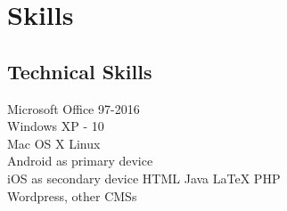 \documentclass[]{deedy-resume-openfont}
\begin{document}
\begin{minipage}[t]{0.33\textwidth}
\sectionsep


\section{Skills}
\subsection{Technical Skills}
\textbullet Microsoft Office 97-2016\\
\textbullet Windows XP - 10\\
\textbullet Mac OS X
\textbullet Linux \\
\textbullet Android as primary device \\
\textbullet iOS as secondary device
\textbullet HTML
\textbullet Java
\textbullet \LaTeX
\textbullet PHP \\
\textbullet Wordpress, other CMSs  \\

\sectionsep

%
%

\end{minipage} 
\hfill
\end{document}
